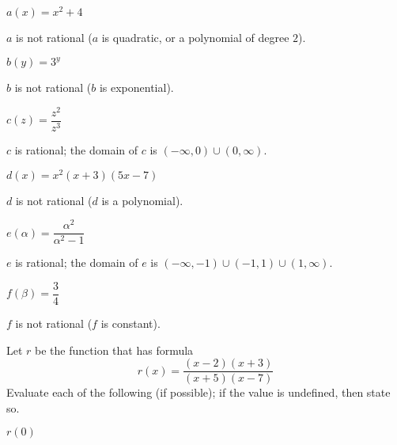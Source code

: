 \begin{exercises}
\begin{problem}
\begin{multicols}{3}
\begin{subproblem}
 		$a(x)=x^2+4$ 
 		\begin{shortsolution}
 			$a$ is not rational ($a$ is quadratic, or a polynomial of degree $2$).
 		\end{shortsolution}
 	\end{subproblem}
 	\begin{subproblem}
 		$b(y)=3^y$
 		\begin{shortsolution}
 			$b$ is not rational ($b$ is exponential).
 		\end{shortsolution}
 	\end{subproblem}
 	\begin{subproblem}
 		$c(z)=\dfrac{z^2}{z^3}$ 
 		\begin{shortsolution}
 			$c$ is rational; the domain of $c$ is $(-\infty,0)\cup (0,\infty)$.
 		\end{shortsolution}
 	\end{subproblem}
 	\begin{subproblem}
 		$d(x)=x^2(x+3)(5x-7)$ 
 		\begin{shortsolution}
 			$d$ is not rational ($d$ is a polynomial).
 		\end{shortsolution}
 	\end{subproblem}
 	\begin{subproblem}
 		$e(\alpha)=\dfrac{\alpha^2}{\alpha^2-1}$ 
 		\begin{shortsolution}
 			$e$ is rational; the domain of $e$ is $(-\infty,-1)\cup(-1,1)\cup(1,\infty)$.
 		\end{shortsolution}
 	\end{subproblem}
 	\begin{subproblem}
 		$f(\beta)=\dfrac{3}{4}$ 
 		\begin{shortsolution}
 			$f$ is not rational ($f$ is constant).
 		\end{shortsolution}
 	\end{subproblem}
 \end{multicols}
 \end{problem}
 \begin{problem}
 Let $r$ be the function that has formula 
 \[
 	r(x)=\frac{(x-2)(x+3)}{(x+5)(x-7)}
 \]
 Evaluate each of the following (if possible); if the value is undefined, 
 then state so.
 \begin{multicols}{4}
 	\begin{subproblem}
 		$r(0)$ 
 		\begin{shortsolution}

\end{shortsolution}
\end{subproblem}
\end{multicols}
\end{problem}
\end{exercises}
